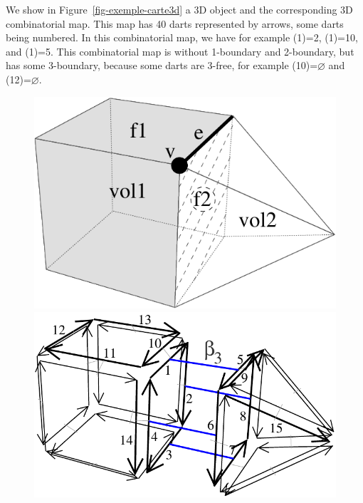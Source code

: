 We show in Figure~\ref{fig-exemple-carte3d} a 3D object and the
corresponding 3D combinatorial map.  This map has 40 darts represented
by arrows, some darts being numbered. In this combinatorial map, we
have for example \betaun{}(1)=2, \betadeux{}(1)=10, and
\betatrois{}(1)=5. This combinatorial map is without 1-boundary and
2-boundary, but has some 3-boundary, because some darts are 3-free,
for example \betatrois{}(10)=$\varnothing$ and \betatrois{}(12)=$\varnothing$.
%
\def\LargFig{.4\textwidth}
\begin{figure}
  \begin{ccTexOnly}
    \begin{center}
      \includegraphics[width=\LargFig]{Combinatorial_map/fig/pdf/object3d}\qquad
      \includegraphics[width=\LargFig]{Combinatorial_map/fig/pdf/exemple-carte2-3d}
    \end{center}
  \end{ccTexOnly}

\end{figure}
